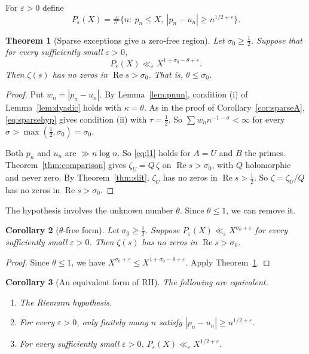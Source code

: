 \documentclass[12pt,letterpaper]{article}
\newtheorem{theorem}{Theorem}[section]
\newtheorem{corollary}[theorem]{Corollary}
\theoremstyle{definition}
\theoremstyle{remark}
\numberwithin{equation}{section}
\newcommand{\Ree}{\operatorname{Re}}
\newcommand{\eps}{\varepsilon}
\begin{document}
For $\eps>0$ define
\[
P_\eps(X)=\#\{n:\ p_n\le X,\ |p_n-u_n|\ge n^{1/2+\eps}\}.
\]

\begin{theorem}[Sparse exceptions give a zero-free region]\label{thm:sparse}
Let $\sigma_0\ge\frac12$. Suppose that for every sufficiently small
$\eps>0$,
\begin{equation}\label{eq:sparsehyp}
P_\eps(X)\ll_\eps X^{1+\sigma_0-\theta+\eps}.
\end{equation}
Then $\zeta(s)$ has no zeros in $\Ree s>\sigma_0$. That is,
$\theta\le\sigma_0$.
\end{theorem}

\begin{proof}
Put $w_n=|p_n-u_n|$. By Lemma~\ref{lem:pnun}, condition (i) of
Lemma~\ref{lem:dyadic} holds with $\kappa=\theta$. As in the proof of
Corollary~\ref{cor:sparseA}, \eqref{eq:sparsehyp} gives condition (ii) with
$\tau=\frac12$. So $\sum w_nn^{-1-\sigma}<\infty$ for every
$\sigma>\max(\frac12,\sigma_0)=\sigma_0$.

Both $p_n$ and $u_n$ are $\gg n\log n$. So \eqref{eq:l1} holds for $A=U$
and $B$ the primes. Theorem~\ref{thm:comparison} gives
$\zeta_U=Q\,\zeta$ on $\Ree s>\sigma_0$, with $Q$ holomorphic and never zero.
By Theorem~\ref{thm:slit}, $\zeta_U$ has no zeros in $\Ree s>\frac12$. So
$\zeta=\zeta_U/Q$ has no zeros in $\Ree s>\sigma_0$.
\end{proof}

The hypothesis involves the unknown number $\theta$. Since $\theta\le1$, we
can remove it.

\begin{corollary}[$\theta$-free form]\label{cor:thetafree}
Let $\sigma_0\ge\frac12$. Suppose $P_\eps(X)\ll_\eps X^{\sigma_0+\eps}$ for
every sufficiently small $\eps>0$. Then $\zeta(s)$ has no zeros in
$\Ree s>\sigma_0$.
\end{corollary}

\begin{proof}
Since $\theta\le1$, we have $X^{\sigma_0+\eps}\le X^{1+\sigma_0-\theta+\eps}$.
Apply Theorem~\ref{thm:sparse}.
\end{proof}

\begin{corollary}[An equivalent form of RH]\label{cor:RHequiv}
The following are equivalent.
\begin{enumerate}[label=(\alph*)]
\item The Riemann hypothesis.
\item For every $\eps>0$, only finitely many $n$ satisfy
  $|p_n-u_n|\ge n^{1/2+\eps}$.
\item For every sufficiently small $\eps>0$,
  $P_\eps(X)\ll_\eps X^{1/2+\eps}$.
\end{enumerate}
\end{corollary}
\end{document}
